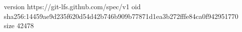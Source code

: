 version https://git-lfs.github.com/spec/v1
oid sha256:14459ae9d235f620d54d42b746b909b77871d1ea3b272fffe84ca0f942951770
size 42478

